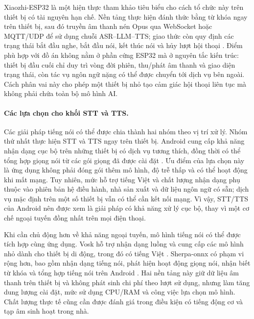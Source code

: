 Xiaozhi-ESP32 là một hiện thực tham khảo tiêu biểu cho cách tổ chức này trên thiết bị có tài nguyên hạn chế. Nền tảng thực hiện đánh thức bằng từ khóa ngay trên thiết bị, sau đó truyền âm thanh nén Opus qua WebSocket hoặc MQTT/UDP để sử dụng chuỗi ASR--LLM--TTS; giao thức còn quy định các trạng thái bắt đầu nghe, bắt đầu nói, kết thúc nói và hủy lượt hội thoại . Điểm phù hợp với đồ án không nằm ở phần cứng ESP32 mà ở nguyên tắc kiến trúc: thiết bị đầu cuối chỉ duy trì vòng đời phiên, thu/phát âm thanh và giao diện trạng thái, còn tác vụ ngôn ngữ nặng có thể được chuyển tới dịch vụ bên ngoài. Cách phân vai này cho phép một thiết bị nhỏ tạo cảm giác hội thoại liên tục mà không phải chứa toàn bộ mô hình AI.

\paragraph{Các lựa chọn cho khối STT và TTS.}
Các giải pháp tiếng nói có thể được chia thành hai nhóm theo vị trí xử lý. Nhóm thứ nhất thực hiện STT và TTS ngay trên thiết bị. Android cung cấp khả năng nhận dạng cục bộ trên những thiết bị có dịch vụ tương thích, đồng thời có thể tổng hợp giọng nói từ các gói giọng đã được cài đặt . Ưu điểm của lựa chọn này là ứng dụng không phải đóng gói thêm mô hình, độ trễ thấp và có thể hoạt động khi mất mạng. Tuy nhiên, mức hỗ trợ tiếng Việt và chất lượng nhận dạng phụ thuộc vào phiên bản hệ điều hành, nhà sản xuất và dữ liệu ngôn ngữ có sẵn; dịch vụ mặc định trên một số thiết bị vẫn có thể cần kết nối mạng. Vì vậy, STT/TTS của Android nên được xem là giải pháp có khả năng xử lý cục bộ, thay vì một cơ chế ngoại tuyến đồng nhất trên mọi điện thoại.

Khi cần chủ động hơn về khả năng ngoại tuyến, mô hình tiếng nói có thể được tích hợp cùng ứng dụng. Vosk hỗ trợ nhận dạng luồng và cung cấp các mô hình nhỏ dành cho thiết bị di động, trong đó có tiếng Việt . Sherpa-onnx có phạm vi rộng hơn, bao gồm nhận dạng tiếng nói, phát hiện hoạt động giọng nói, nhận biết từ khóa và tổng hợp tiếng nói trên Android . Hai nền tảng này giữ dữ liệu âm thanh trên thiết bị và không phát sinh chi phí theo lượt sử dụng, nhưng làm tăng dung lượng cài đặt, mức sử dụng CPU/RAM và công việc lựa chọn mô hình. Chất lượng thực tế cũng cần được đánh giá trong điều kiện có tiếng động cơ và tạp âm sinh hoạt trong nhà.

